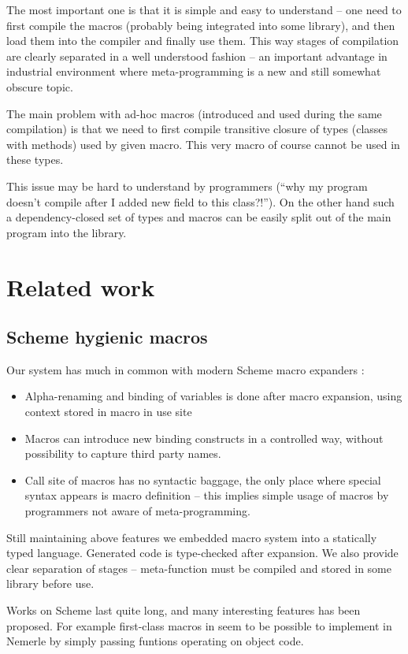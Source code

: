 \documentclass{llncs}
\begin{document}
The most important one is that it is simple and easy to understand --
one need to first compile the macros (probably being integrated into
some library), and then load them into the compiler and finally use
them. This way stages of compilation are clearly separated in a well
understood fashion -- an important advantage in industrial environment
where meta-programming is a new and still somewhat obscure topic.

The main problem with ad-hoc macros (introduced and used during the
same compilation) is that we need to first compile transitive closure
of types (classes with methods) used by given macro. This very macro
of course cannot be used in these types.

This issue may be hard to understand by programmers (``why my program
doesn't compile after I added new field to this class?!''). On the
other hand such a dependency-closed set of types and macros can be
easily split out of the main program into the library.



\section{Related work}
\subsection{Scheme hygienic macros}
Our system has much in common with modern Scheme macro expanders \cite{Scheme:HygienicAlg}:
\begin{itemize}
\item Alpha-renaming and binding of variables is done after macro expansion, using
      context stored in macro in use site
\item Macros can introduce new binding constructs in a controlled way,
      without possibility to capture third party names.
\item Call site of macros has no syntactic baggage, the only place where
      special syntax appears is macro definition -- this implies simple
      usage of macros by programmers not aware of meta-programming.
\end{itemize}

Still maintaining above features we embedded macro system into a statically typed
language. Generated code is type-checked after expansion. We also provide clear
separation of stages -- meta-function must be compiled and stored in some library
before use.

Works on Scheme last quite long, and many interesting features has been proposed.
For example first-class macros in \cite{Macros:FirstClass} seem to be possible
to implement in Nemerle by simply passing funtions operating on object code.
\end{document}
